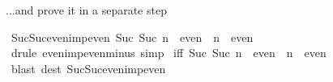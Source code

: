 \begin{isabellebody}
\begin{isamarkuptext}
...and prove it in a separate step%
\end{isamarkuptext}%
\ Suc{\isacharunderscore}Suc{\isacharunderscore}even{\isacharunderscore}imp{\isacharunderscore}even{\isacharcolon}\ {\isachardoublequote}Suc\ {\isacharparenleft}Suc\ n{\isacharparenright}\ {\isasymin}\ even\ {\isasymLongrightarrow}\ n\ {\isasymin}\ even{\isachardoublequote}\isanewline
{}\ {\isacharparenleft}drule\ even{\isacharunderscore}imp{\isacharunderscore}even{\isacharunderscore}minus{\isacharunderscore}{}{\isacharcomma}\ simp{\isacharparenright}\isanewline
\isanewline
\isanewline
{}\ {\isacharbrackleft}iff{\isacharbrackright}{\isacharcolon}\ {\isachardoublequote}{\isacharparenleft}{\isacharparenleft}Suc\ {\isacharparenleft}Suc\ n{\isacharparenright}{\isacharparenright}\ {\isasymin}\ even{\isacharparenright}\ {\isacharequal}\ {\isacharparenleft}n\ {\isasymin}\ even{\isacharparenright}{\isachardoublequote}\isanewline
{}\ {\isacharparenleft}blast\ dest{\isacharcolon}\ Suc{\isacharunderscore}Suc{\isacharunderscore}even{\isacharunderscore}imp{\isacharunderscore}even{\isacharparenright}\isanewline
\isanewline
{}\isanewline
\isanewline
\end{isabellebody}%

